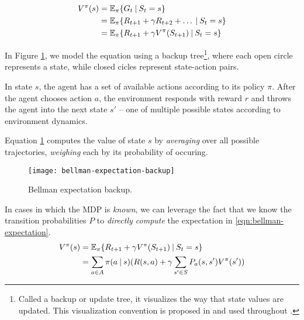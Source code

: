 \begin{equation} \label{eqn:bellman-expectation}
\begin{aligned}
    V^{\pi}(s)
        &= \mathbb{E}_{\pi}\{ G_t \:\vert\: S_t = s \} \\
        &= \mathbb{E}_{\pi}\{ R_{t+1} + \gamma R_{t+2} + \dots \:\vert\: S_t = s \} \\
        &= \mathbb{E}_{\pi}\{ R_{t+1} + \gamma V^{\pi}(S_{t+1}) \:\vert\: S_{t} = s \} \\
\end{aligned}
\end{equation}

In Figure \ref{fig:expectation-backup}, we model the equation using a backup tree\footnote{Called a backup or update tree, it visualizes the way that state values are updated. This visualization convention is proposed in and used throughout \cite{rlai}.}, where each open circle represents a state, while closed cicles represent state-action pairs.

In state $s$, the agent has a set of available actions according to its policy $\pi$.
After the agent chooses action $a$, the environment responds with reward $r$ and throws the agent into the next state  $s'$ -- one of multiple possible states according to environment dynamics.

Equation \ref{fig:expectation-backup} computes the value of state $s$ by \emph{averaging} over all possible trajectories, \emph{weighing} each by its probability of occuring.

\begin{figure}[ht]
    \centering
    \caption{Bellman expectation backup.} \label{fig:expectation-backup}
    \vspace*{0.2cm}
    \texttt{[image: bellman-expectation-backup]}
\end{figure}

In cases in which the MDP is \emph{known}, we can leverage the fact that we know the transition probabilities $P$ to \emph{directly compute} the expectation in \ref{eqn:bellman-expectation}.
\begin{equation}
    \begin{aligned}
        V^{\pi}(s)
            &= \mathbb{E}_{\pi}\{ R_{t+1} + \gamma V^{\pi}(S_{t+1}) \:\vert\: S_{t} = s \} \\
            &= \sum_{a \in A}{
                \pi(a \:\vert\: s) ( R(s, a) + \gamma \sum_{s' \in S}{
                    P_a(s, s') V^{\pi}(s')
                })
            }
    \end{aligned}
\end{equation}

